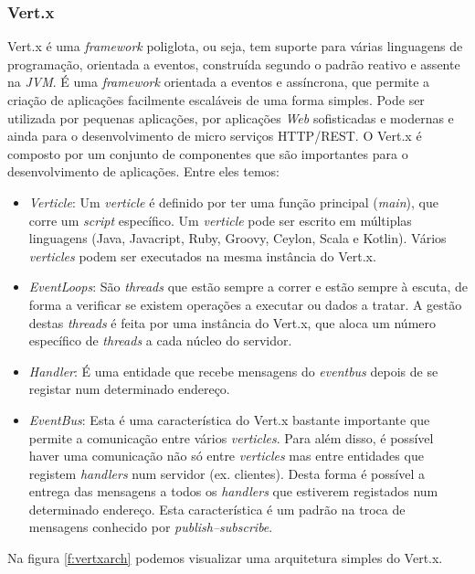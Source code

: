 \subsubsection{Vert.x}
Vert.x é uma \textit{framework} poliglota, ou seja, tem suporte para várias linguagens de programação, orientada a eventos, construída segundo o padrão reativo e assente na \textit{\gls{JVM}}. É uma \textit{framework} orientada a eventos e assíncrona, que permite a criação de aplicações facilmente escaláveis de uma forma simples. Pode ser utilizada por pequenas aplicações, por aplicações \textit{Web} sofisticadas e modernas e ainda para o desenvolvimento de micro serviços \gls{HTTP}/\gls{REST}\cite{vertx-io}.
O Vert.x é composto por um conjunto de componentes que são importantes para o desenvolvimento de aplicações. Entre eles temos: 
\begin{itemize}
  \item \textit{Verticle}: Um \textit{verticle} é definido por ter uma função principal (\textit{main}), que corre um \textit{script} específico. Um \textit{verticle} pode ser escrito em múltiplas linguagens (Java, Javacript, Ruby, Groovy, Ceylon, Scala e Kotlin). Vários \textit{verticles} podem ser executados na mesma instância do Vert.x.
  \item \textit{EventLoops}: São \textit{threads} que estão sempre a correr e estão sempre à escuta, de forma a verificar se existem operações a executar ou dados a tratar. A gestão destas \textit{threads} é feita por uma instância do Vert.x, que aloca um número específico de \textit{threads} a cada núcleo do servidor.
  \item \textit{Handler}: É uma entidade que recebe mensagens do \textit{eventbus} depois de se registar num determinado endereço.
  \item \textit{EventBus}: Esta é uma característica do Vert.x bastante importante que permite a comunicação entre vários \textit{verticles}. Para além disso, é possível haver uma comunicação não só entre \textit{verticles} mas entre entidades que registem \textit{handlers} num servidor (ex. clientes). Desta forma é possível a entrega das mensagens a todos os \textit{handlers} que estiverem registados num determinado endereço. Esta característica é um padrão na troca de mensagens conhecido por \textit{publish–subscribe}.
\end{itemize}
Na figura \ref{f:vertxarch} podemos visualizar uma arquitetura simples do Vert.x. \cite{vertx-study}


